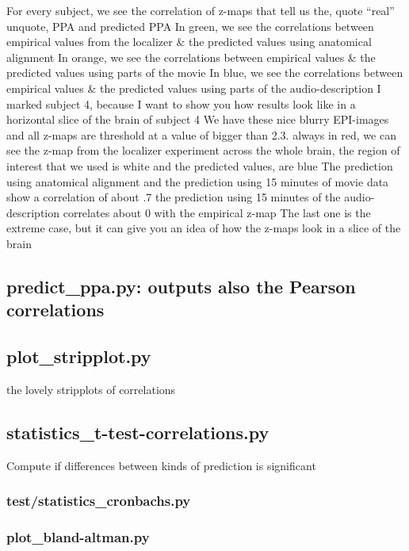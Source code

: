 %
For every subject, we see the correlation of z-maps that tell us the, quote
``real'' unquote, PPA and predicted PPA
%
In green, we see the correlations between empirical values from the localizer \&
the predicted values using anatomical alignment
%
In orange, we see the correlations between empirical values \& the predicted
values using parts of the movie
%
In blue, we see the correlations between empirical values \& the predicted
values using parts of the audio-description
%
I marked subject 4, because I want to show you how results look like in a
horizontal slice of the brain of subject 4
%
We have these nice blurry EPI-images and all z-maps are threshold at a value of
bigger than 2.3.
%
always in red, we can see the z-map from the localizer experiment across the
whole brain,
%
the region of interest that we used is white and the predicted values, are blue
%
The prediction using anatomical alignment and the prediction using 15 minutes of
movie data show a correlation of about .7
%
the prediction using 15 minutes of the audio-description correlates about 0 with
the empirical z-map
%
The last one is the extreme case, but it can give you an idea of how the z-maps
look in a slice of the brain


\subsection{predict\_ppa.py: outputs also the Pearson correlations}


\subsection{plot\_stripplot.py}

the lovely stripplots of correlations

\subsection{statistics\_t-test-correlations.py}

Compute if differences between kinds of prediction is significant


\subsubsection{test/statistics\_cronbachs.py}

\subsubsection{plot\_bland-altman.py}

